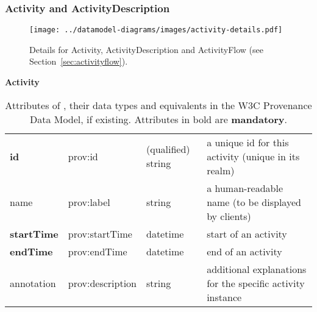 
\subsubsection{Activity and ActivityDescription}
\label{sec:activity}

\begin{figure}[h]
\centering
\texttt{[image: ../datamodel-diagrams/images/activity-details.pdf]}
\caption{Details for Activity, ActivityDescription and ActivityFlow (see Section~\ref{sec:activityflow}). 
}
\label{fig:activity-details}
\end{figure}

\begin{table}[h]

\small
{}\textwidth

\textbf{\normalsize Activity}\vspace{0.25em}\\
\begin{tabulary}{1.0\textwidth}{@{}lp{2.5cm}p{2cm}L@{}}
\toprule
{} &  &  & \\
\midrule
\textbf{id} & prov:id  & (qualified) string & a unique id for this activity (unique in its realm)\\
name        & prov:label  & string & a human-readable name (to be displayed by clients)\\
\textbf{startTime} & prov:startTime & datetime & start of an activity\\
\textbf{endTime} & prov:endTime  & datetime & end of an activity\\
annotation        & prov:description & string & additional explanations for the specific activity instance\\
\bottomrule
\end{tabulary}
\caption{Attributes of , their data types and equivalents in the W3C Provenance 
Data Model, if existing. Attributes in bold are \textbf{mandatory}.}
\end{table}



